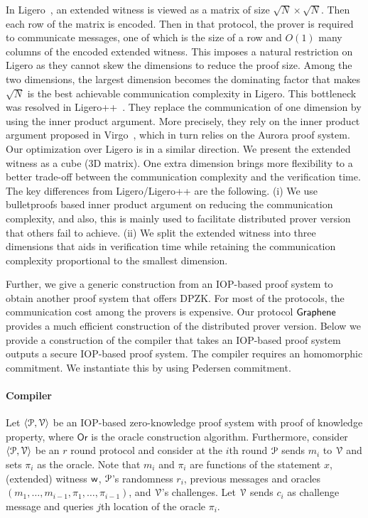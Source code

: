 In Ligero~\cite{ligero}, an extended witness is viewed as a matrix of size $\sqrt{N} \times \sqrt{N}$. Then each row of the matrix is encoded. Then in that protocol, the prover is required to communicate messages, one of which is the size of a row and $O(1)$ many columns of the encoded extended witness. This imposes a natural restriction on Ligero as they cannot skew the dimensions to reduce the proof size. Among the two dimensions, the largest dimension becomes the dominating factor that makes $\sqrt{N}$ is the best achievable communication complexity in Ligero. This bottleneck was resolved in Ligero++~\cite{ligero++}. They replace the communication of one dimension by using the inner product argument. More precisely, they rely on the inner product argument proposed in Virgo~\cite{Virgo}, which in turn relies on the Aurora proof system. Our optimization over Ligero is in a similar direction. We present the extended witness as a cube (3D matrix). One extra dimension brings more flexibility to a better trade-off between the communication complexity and the verification time. The key differences from Ligero/Ligero++ are the following.
(i) We use bulletproofs based inner product argument on reducing the communication complexity, and also, this is mainly used to facilitate distributed prover version that others fail to achieve.
(ii) We split the extended witness into three dimensions that aids in verification time while retaining the communication complexity proportional to the smallest dimension.

Further, we give a generic construction from an IOP-based proof system to obtain another proof system that offers DPZK. For most of the protocols, the communication cost among the provers is expensive. Our protocol $\textsf{Graphene}$ provides a much efficient construction of the distributed prover version.
Below we provide a construction of the compiler that takes an IOP-based proof system outputs a secure IOP-based proof system. The compiler requires an homomorphic commitment. We instantiate this by using Pedersen commitment.

\paragraph*{Compiler} Let $\langle \mathcal{P}, \mathcal{V} \rangle$ be an IOP-based zero-knowledge proof system with proof of knowledge property, where $\mathsf{Or}$ is the oracle construction algorithm. 
Furthermore, consider $\langle \mathcal{P}, \mathcal{V} \rangle$ be an $r$ round protocol and consider at the $i$th round $\mathcal{P}$ sends $m_i$ to $\mathcal{V}$ and sets $\pi_i$ as the oracle. Note that $m_i$ and $\pi_i$ are functions of the statement $x$, (extended) witness $\mathsf{w}$, $\mathcal{P}$'s randomness $r_i$, previous messages and oracles $(m_1, \ldots, m_{i-1}, \pi_1, \ldots, \pi_{i-1})$, and $\mathcal{V}$'s challenges.
Let $\mathcal{V}$ sends $c_i$ as challenge message and queries $j$th location of the oracle $\pi_i$.

